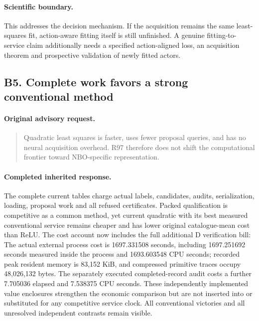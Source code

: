\paragraph{Scientific boundary.}
This addresses the decision mechanism. If the acquisition remains the same least-squares fit, action-aware fitting itself is still unfinished. A genuine fitting-to-service claim additionally needs a specified action-aligned loss, an acquisition theorem and prospective validation of newly fitted actors.

\subsection{B5. Complete work favors a strong conventional method}
\label{response120:B5}
\paragraph{Original advisory request.}
\begin{quote}
Quadratic least squares is faster, uses fewer proposal queries, and has no neural acquisition overhead. R97 therefore does not shift the computational frontier toward NBO-specific representation.
\end{quote}
\paragraph{Completed inherited response.}
The complete current tables charge actual labels, candidates, audits, serialization, loading, proposal work and all refused certificates. Packed qualification is competitive as a common method, yet current quadratic with its best measured conventional service remains cheaper and has lower original catalogue-mean cost than ReLU. The cost account now includes the full additional D verification bill: The actual external process cost is 1697.331508 seconds, including 1697.251692 seconds measured inside the process and 1693.603548 CPU seconds; recorded peak resident memory is 83,152 KiB, and compressed primitive traces occupy 48,026,132 bytes. The separately executed completed-record audit costs a further 7.705036 elapsed and 7.538375 CPU seconds. These independently implemented value enclosures strengthen the economic comparison but are not inserted into or substituted for any competitive service clock. All conventional victories and all unresolved independent contrasts remain visible.

